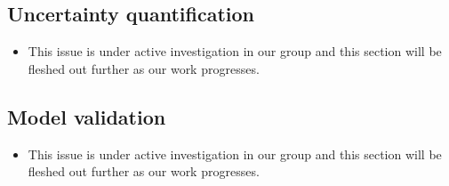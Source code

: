 \subsection{Uncertainty quantification}

\begin{itemize}
  \item This issue is under active investigation in our group and this section will be fleshed out further as our work progresses.
\end{itemize}

\subsection{Model validation}

\begin{itemize}
  \item This issue is under active investigation in our group and this section will be fleshed out further as our work progresses.
\end{itemize}
